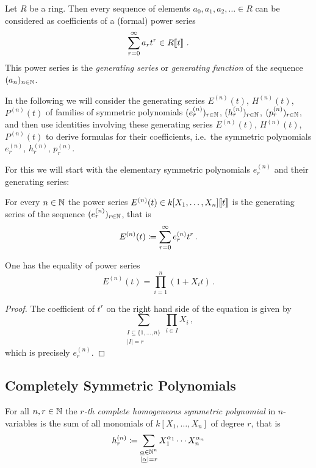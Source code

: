 \begin{fluff}
  Let $R$ be a ring.
  Then every sequence of elements $a_0, a_1, a_2, \dotsc \in R$ can be considered as coefficients of a (formal) power series
  \[
        \sum_{r=0}^\infty a_r t^r
    \in R\!\left[\!\left[t\right]\!\right] \,.
  \]
  This power series is the \emph{generating series} or \emph{generating function} of the sequence $(a_n)_{n \in \mathbb{N}}$.
  
  In the following we will consider the generating series $E^{(n)}(t)$, $H^{(n)}(t)$, $P^{(n)}(t)$ of families of symmetric polynomials $(e^{(n)}_r)_{r \in \mathbb{N}}$, $(h^{(n)}_r)_{r \in \mathbb{N}}$, $(p^{(n)}_r)_{r \in \mathbb{N}}$, and then use identities involving these generating series $E^{(n)}(t)$, $H^{(n)}(t)$, $P^{(n)}(t)$ to derive formulas for their coefficients, i.e.\ the symmetric polynomials $e^{(n)}_r$, $h^{(n)}_r$, $p^{(n)}_r$.
  
  For this we will start with the elementary symmetric polynomials $e^{(n)}_r$ and their generating series:
\end{fluff}


\begin{definition}
  For every $n \in \mathbb{N}$ the power series $E^{(n)}(t) \in k[X_1, \dotsc, X_n]\!\left[\!\left[t\right]\!\right]$ is the generating series of the sequence $(e^{(n)}_r)_{r \in \mathbb{N}}$, that is
  \[
              E^{(n)}(t)
    \coloneqq  \sum_{r=0}^\infty e^{(n)}_r t^r \,.
  \]
\end{definition}


\begin{lemma}
  \label{lemma: explicit formula for E}
  One has the equality of power series
  \[
      E^{(n)}(t)
    = \prod_{i=1}^n (1 + X_i t) \,.
  \]
\end{lemma}


\begin{proof}
  The coefficient of $t^r$ on the right hand side of the equation is given by
  \[
    \sum_{\substack{I \subseteq \{1, \dotsc, n\} \\ |I| = r}} \prod_{i \in I} X_i \,,
  \]
  which is precisely $e^{(n)}_r$.
\end{proof}





\subsection{Completely Symmetric Polynomials}


\begin{definition}
  For all $n, r \in \mathbb{N}$ the \emph{$r$-th complete homogeneous symmetric polynomial} in $n$-variables is the sum of all monomials of $k[X_1, \dotsc, X_n]$ of degree $r$, that is
  \[
              h^{(n)}_r
    \coloneqq  \sum_{\substack{\underline{\alpha} \in \mathbb{N}^n \\ |\underline{\alpha}| = r}}
              X_1^{\alpha_1} \dotsm X_n^{\alpha_n}
  \]
\end{definition}


